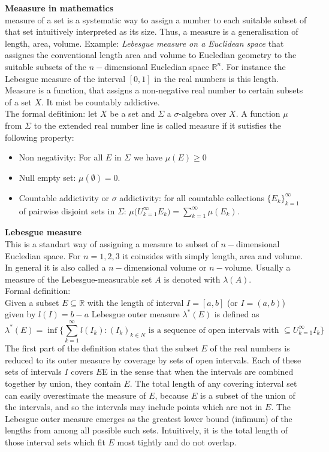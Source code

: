 \documentclass[11pt,a4paper,headinclude=true,DIV=14,BCOR=8mm,chapterprefix,listof=totoc,twoside,openright,abstracton]{scrbook}
\begin{document}
\begin{sidenote}
    \textbf{Meaasure in mathematics} \\
    measure of a set is a systematic way to assign a number to each suitable subset of that set intuitively interpreted as its size. Thus, a measure is a generalisation of length, area, volume. Example: \textit{Lebesgue measure on a Euclidean space} that assignes the conventional length area and volume to Eucledian geometry to the suitable subsets of the $n-$dimensional Eucledian space $\mathbb{R}^n$. For instance the Lebesgue measure of the interval $[0,1]$ in the real numbers is this length. \\
    Measure is a function, that assigns a non-negative real number to certain subsets of a set $X$. It mist be countably addictive. \\
    The formal defitinion: let $X$ be a set and $\Sigma$ a $\sigma$-algebra over $X$. A function $\mu$ from $\Sigma$ to the extended real number line is called measure if it sutisfies the following property:
    \begin{itemize}
        \item Non negativity: For all $E$ in $\Sigma$ we have $\mu(E)\geq 0$
        \item Null empty set: $\mu(\emptyset) = 0$.
        \item Countable addictivity or $\sigma$ addictivity: for all countable collections $\{E_k\}_{k=1}^{\infty}$ of pairwise disjoint sets in $\Sigma$: $\mu\Big(U_{k=1}^{\infty}E_k\Big) = \sum_{k=1}^{\infty}\mu(E_k)$.
    \end{itemize}
    \textbf{Lebesgue measure} \\
    This is a standart way of assigning a measure to subset of $n-$dimensional Eucledian space. For $n=1,2,3$ it coinsides with simply length, area and volume. In general it is also called a $n-$dimensional volume or $n-$volume. Usually a measure of the Lebesgue-measurable set $A$ is denoted with $\lambda(A)$. \\
    Formal definition: \\
    Given a subset $E\subseteq\mathbb{R}$ with the length of interval $I=[a,b]$ (or $I=(a,b)$) given by $l(I) = b-a$ Lebesgue outer measure $\lambda^*(E)$ is defined as 
    \begin{equation}
        \lambda^*(E) = \inf\Bigg\{\sum_{k=1}^{\infty}l(I_k):(I_k)_{k\in N} \text{ is a sequence of open intervals with } \subseteq U_{k=1}^{\infty}I_k\Bigg\}
    \end{equation}
    The first part of the definition states that the subset $E$ of the real numbers is reduced to its outer measure by coverage by sets of open intervals. Each of these sets of intervals $I$ covers $E$E in the sense that when the intervals are combined together by union, they contain $E$. The total length of any covering interval set can easily overestimate the measure of $E$, because $E$ is a subset of the union of the intervals, and so the intervals may include points which are not in $E$. The Lebesgue outer measure emerges as the greatest lower bound (infimum) of the lengths from among all possible such sets. Intuitively, it is the total length of those interval sets which fit $E$ most tightly and do not overlap.\\

\end{sidenote}
\end{document}
